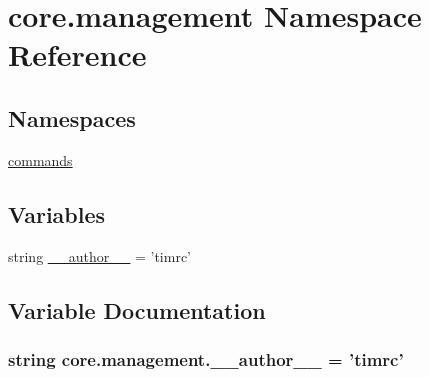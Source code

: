 \hypertarget{namespacecore_1_1management}{\section{core.\-management Namespace Reference}
\label{namespacecore_1_1management}
}
\subsection*{Namespaces}
\begin{DoxyCompactItemize}
\item 
\hyperlink{namespacecore_1_1management_1_1commands}{commands}
\end{DoxyCompactItemize}
\subsection*{Variables}
\begin{DoxyCompactItemize}
\item 
string \hyperlink{namespacecore_1_1management_ae3082b96220121385ce826286ade727a}{\-\_\-\-\_\-author\-\_\-\-\_\-} = 'timrc'
\end{DoxyCompactItemize}


\subsection{Variable Documentation}
\hypertarget{namespacecore_1_1management_ae3082b96220121385ce826286ade727a}{
\subsubsection[{\-\_\-\-\_\-author\-\_\-\-\_\-}]{\setlength{\rightskip}{0pt plus 5cm}string core.\-management.\-\_\-\-\_\-author\-\_\-\-\_\- = 'timrc'}}\label{namespacecore_1_1management_ae3082b96220121385ce826286ade727a}
